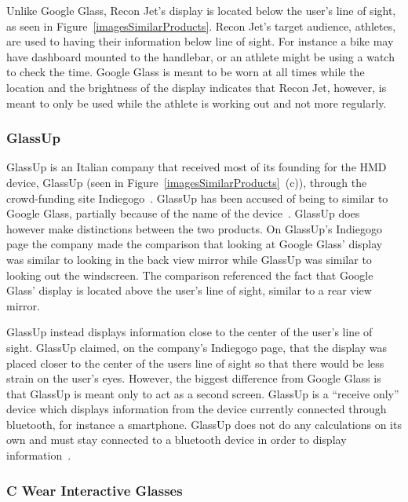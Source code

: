 Unlike Google Glass, Recon Jet's display is located below the user's line of sight, as seen in Figure~\ref{imagesSimilarProducts}. Recon Jet's target audience, athletes, are used to having their information below line of sight. For instance a bike may have dashboard mounted to the handlebar, or an athlete might be using a watch to check the time. Google Glass is meant to be worn at all times while the location and the brightness of the display indicates that Recon Jet, however, is meant to only be used while the athlete is working out and not more regularly.

\subsubsection{GlassUp~\cite{glassUp}}

GlassUp is an Italian company that received most of its founding for the HMD device, GlassUp (seen in Figure~\ref{imagesSimilarProducts}~(c)), through the crowd-funding site Indiegogo~\cite{glassUpIndiegogo}. GlassUp has been accused of being to similar to Google Glass, partially because of the name of the device~\cite{glassUpLegal}. GlassUp does however make distinctions between the two products. On GlassUp's Indiegogo page the company made the comparison that looking at Google Glass' display was similar to looking in the back view mirror while GlassUp was similar to looking out the windscreen. The comparison referenced the fact that Google Glass' display is located above the user's line of sight, similar to a rear view mirror.

GlassUp instead displays information close to the center of the user's line of sight. GlassUp claimed, on the company's Indiegogo page, that the display was placed closer to the center of the users line of sight so that there would be less strain on the user's eyes. However, the biggest difference from Google Glass is that GlassUp is meant only to act as a second screen. GlassUp is a ``receive only'' device which displays information from the device currently connected through bluetooth, for instance a smartphone. GlassUp does not do any calculations on its own and must stay connected to a bluetooth device in order to display information~\cite{glassUpIndiegogo}.

\subsubsection{C Wear Interactive Glasses~\cite{penny}}

